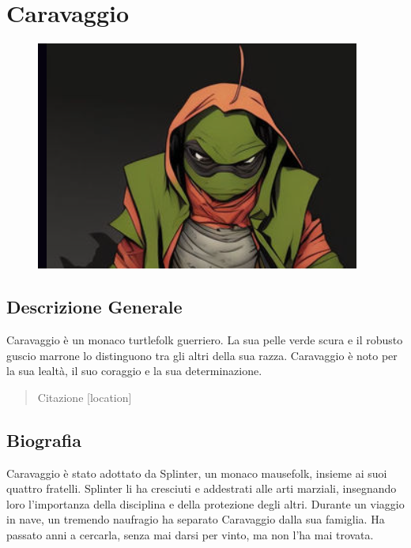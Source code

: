 \section{Caravaggio}\label{caravaggio}


\begin{figure}
\centering
\includegraphics{Screenshot_2023-10-03_204548.png}
\end{figure}

\subsection{Descrizione Generale}\label{descrizione-generale}



Caravaggio è un monaco turtlefolk guerriero. La sua pelle verde scura e
il robusto guscio marrone lo distinguono tra gli altri della sua razza.
Caravaggio è noto per la sua lealtà, il suo coraggio e la sua
determinazione.

\begin{quote}
Citazione {[}location{]}
\end{quote}

\subsection{Biografia}\label{biografia}


Caravaggio è stato adottato da Splinter, un monaco mausefolk, insieme ai
suoi quattro fratelli. Splinter li ha cresciuti e addestrati alle arti
marziali, insegnando loro l'importanza della disciplina e della
protezione degli altri. Durante un viaggio in nave, un tremendo
naufragio ha separato Caravaggio dalla sua famiglia. Ha passato anni a
cercarla, senza mai darsi per vinto, ma non l'ha mai trovata.

